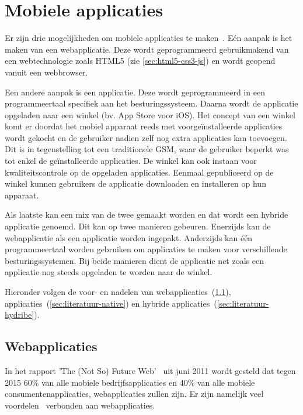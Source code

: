 
\section{Mobiele applicaties}
\label{sec:mobiele-applicaties}
Er zijn drie mogelijkheden om mobiele applicaties te maken~\cite{Accenture2012,Hales2012}. Eén aanpak is het maken van een webapplicatie.
Deze wordt geprogrammeerd gebruikmakend van een webtechnologie zoals HTML5 (zie \ref{sec:html5-css3-js}) en wordt geopend vanuit een webbrowser. 

Een andere aanpak is een  applicatie. 
Deze wordt geprogrammeerd in een programmeertaal specifiek aan het besturingssysteem.
Daarna wordt de applicatie opgeladen naar een winkel (bv. App Store voor iOS).
Het concept van een winkel komt er doordat het mobiel apparaat reeds met voorgeïnstalleerde applicaties wordt gekocht en de gebruiker nadien zelf nog extra applicaties kan toevoegen.
Dit is in tegenstelling tot een traditionele GSM, waar de gebruiker beperkt was tot enkel de geïnstalleerde applicaties. 
De winkel kan ook instaan voor kwaliteitscontrole op de opgeladen applicaties.
Eenmaal gepubliceerd op de winkel kunnen gebruikers de applicatie downloaden en installeren op hun apparaat.

Als laatste kan een mix van de twee gemaakt worden en dat wordt een hybride applicatie genoemd.
Dit kan op twee manieren gebeuren.
Enerzijds kan de webapplicatie als een  applicatie worden ingepakt.
Anderzijds kan één programmeertaal worden gebruiken om  applicaties te maken voor verschillende besturingssystemen.
Bij beide manieren dient de applicatie net zoals een  applicatie nog steeds opgeladen te worden naar de winkel.

Hieronder volgen de voor- en nadelen van webapplicaties~(\ref{sec:literatuur-webapps}),  applicaties~(\ref{sec:literatuur-native}) en hybride applicaties~(\ref{sec:literatuur-hydribe}).

\subsection{Webapplicaties}
\label{sec:literatuur-webapps}
In het rapport 'The (Not So) Future Web'~\cite{Phifer2011} uit juni 2011 wordt gesteld dat tegen 2015 60\% van alle mobiele bedrijfsapplicaties en 40\% van alle mobiele consumentenapplicaties, webapplicaties zullen zijn. 
Er zijn namelijk veel voordelen~\cite{Accenture2012} verbonden aan webapplicaties.

